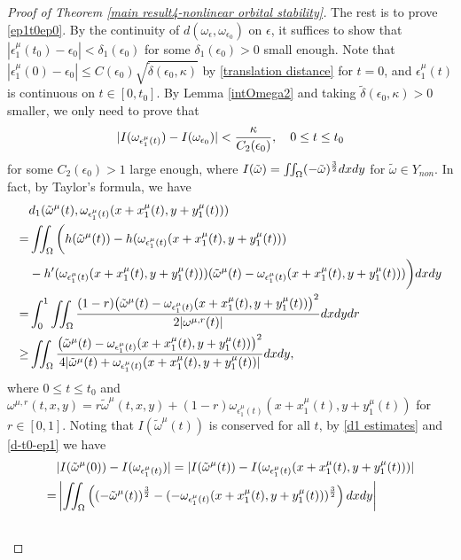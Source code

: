 \documentclass[1 [leqno, 11pt]{amsart}
\numberwithin{equation}{section}
\let\ep=\epsilon
\begin{document}
\begin{CJK*}{GBK}{song}
\begin{proof}[Proof of  Theorem \ref{main result4-nonlinear orbital stability}]
The rest is to prove \eqref{ep1t0ep0}. By the continuity of $
d(\omega_{\ep},\omega_{\ep_0})$ on $\ep$, it suffices to show that $|\ep_1^\mu(t_0)-\ep_0|<\delta_1(\ep_0)$ for some  $\delta_1(\ep_0)>0$ small enough.
Note that
$|\ep_1^{\mu}(0)-\ep_0|\leq C(\ep_0)\sqrt{\tilde\delta(\ep_0,\kappa)}$ by \eqref{translation distance} for $t=0$, and $\ep_1^{\mu}(t)$ is continuous on $t\in[0,t_0]$.
 By Lemma \ref{intOmega2} and taking $\tilde\delta(\ep_0,\kappa)>0$ smaller, we only need to prove that
\begin{align}\label{I-omegaep1t0-omegaep0}
|I(\omega_{\ep_1^\mu(t)})-I(\omega_{\ep_0})|<{\kappa\over C_2(\ep_0)},\quad 0\leq t\leq t_0
\end{align}
for some $C_2(\ep_0)>1$ large enough, where $I(\tilde \omega)=\iint_{\Omega}(-\tilde \omega)^{3\over2}dxdy$ for $\tilde \omega\in Y_{non}$. In fact, by Taylor's formula, we have
\begin{align}\nonumber
&d_1(\tilde \omega^\mu(t),\omega_{\ep_1^\mu(t)}(x+x_1^\mu(t),y+y_1^\mu(t)))\\\nonumber
=&\iint_{\Omega}\bigg(h(\tilde \omega^\mu(t))-h(\omega_{\ep_1^\mu(t)}(x+x_1^\mu(t),y+y_1^\mu(t)))\\\nonumber
&-h'(\omega_{\ep_1^\mu(t)}(x+x_1^\mu(t),y+y_1^\mu(t)))
(\tilde \omega^\mu(t)-\omega_{\ep_1^\mu(t)}(x+x_1^\mu(t),y+y_1^\mu(t)))\bigg)dxdy\\\nonumber
=&\int_0^1\iint_\Omega{(1-r)\big(\tilde \omega^\mu(t)-\omega_{\ep_1^\mu(t)}(x+x_1^\mu(t),y+y_1^\mu(t))\big)^2\over 2|\omega^{\mu,r}(t)|}dxdydr\\\label{d1 estimates}
\geq&\iint_\Omega{\big(\tilde \omega^\mu(t)-\omega_{\ep_1^\mu(t)}(x+x_1^\mu(t),y+y_1^\mu(t))\big)^2\over 4|\tilde \omega^\mu(t)+\omega_{\ep_1^\mu(t)}(x+x_1^\mu(t),y+y_1^\mu(t))|}dxdy,
\end{align}
where $0\leq t\leq t_0$ and $\omega^{\mu,r}(t,x,y)=r\tilde \omega^\mu(t,x,y)+(1-r)\omega_{\ep_1^\mu(t)}(x+x_1^\mu(t),y+y_1^\mu(t))
$ for $r\in[0,1]$.
Noting that $I(\tilde \omega^\mu(t))$ is conserved for all $t$, by \eqref{d1 estimates} and \eqref{d-t0-ep1}  we have
\begin{align}\nonumber
&|I(\tilde \omega^\mu(0))-I(\omega_{\ep_1^\mu(t)})|=|I(\tilde \omega^\mu(t))-I(\omega_{\ep_1^\mu(t)}(x+x_1^\mu(t),y+y_1^\mu(t)))|\\\nonumber
=&\left|\iint_\Omega\left((-\tilde \omega^\mu(t))^{3\over2}-(-\omega_{\ep_1^\mu(t)}(x+x_1^\mu(t),y+y_1^\mu(t)))^{3\over2}\right)dxdy\right|\\\nonumber

\end{align}
\end{proof}
\end{CJK*}
\end{document}
